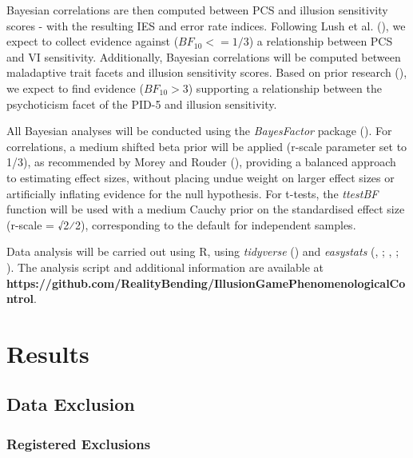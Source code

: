 \documentclass[
  man,
  floatsintext,
  longtable,
  nolmodern,
  notxfonts,
  notimes,
  colorlinks=true,linkcolor=blue,citecolor=blue,urlcolor=blue]{apa7}
\begin{document}
Bayesian correlations are then computed between PCS and illusion
sensitivity scores - with the resulting IES and error rate indices.
Following Lush et al. (), we expect to
collect evidence against (\(BF_{10} <= 1/3\)) a relationship between PCS
and VI sensitivity. Additionally, Bayesian correlations will be computed
between maladaptive trait facets and illusion sensitivity scores. Based
on prior research (),
we expect to find evidence (\(BF_{10} > 3\)) supporting a relationship
between the psychoticism facet of the PID-5 and illusion sensitivity.

All Bayesian analyses will be conducted using the \emph{BayesFactor}
package (). For
correlations, a medium shifted beta prior will be applied (r-scale
parameter set to 1/3), as recommended by Morey and Rouder
(), providing a balanced
approach to estimating effect sizes, without placing undue weight on
larger effect sizes or artificially inflating evidence for the null
hypothesis. For t-tests, the \emph{ttestBF} function will be used with a
medium Cauchy prior on the standardised effect size (r-scale = √2⁄2),
corresponding to the default for independent samples.

Data analysis will be carried out using R, using \emph{tidyverse}
() and \emph{easystats}
(,
; , ;
). The analysis script and
additional information are available at
\textbf{https://github.com/RealityBending/IllusionGamePhenomenologicalControl}.

\section{Results}\label{results}

\subsection{Data Exclusion}\label{data-exclusion}

\subsubsection{Registered Exclusions}\label{registered-exclusions}
\end{document}

